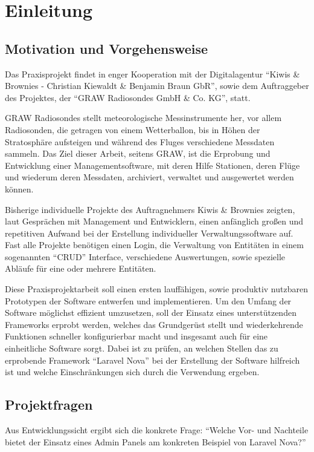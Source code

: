 \section{Einleitung}

\subsection{Motivation und Vorgehensweise}
Das Praxisprojekt findet in enger Kooperation mit der Digitalagentur \enquote{Kiwis \& Brownies - Christian Kiewaldt \& Benjamin Braun GbR}\cite{kiwis}, sowie dem Auftraggeber des Projektes, der \enquote{GRAW Radiosondes GmbH \& Co. KG}\cite{graw}, statt.

GRAW Radiosondes stellt meteorologische Messinstrumente her, vor allem Radiosonden, die getragen von einem Wetterballon, bis in Höhen der Stratosphäre aufsteigen und während des Fluges verschiedene Messdaten sammeln.
Das Ziel dieser Arbeit, seitens GRAW, ist die Erprobung und Entwicklung einer Managementsoftware, mit deren Hilfe Stationen, deren Flüge und wiederum deren Messdaten, archiviert, verwaltet und ausgewertet werden können.

Bisherige individuelle Projekte des Auftragnehmers Kiwis \& Brownies zeigten, laut Gesprächen mit Management und Entwicklern, einen anfänglich großen und repetitiven Aufwand bei der Erstellung individueller Verwaltungssoftware auf.
Fast alle Projekte benötigen einen Login, die Verwaltung von Entitäten in einem sogenannten \enquote{CRUD}\cite{crud} Interface, verschiedene Auswertungen, sowie spezielle Abläufe für eine oder mehrere Entitäten.

Diese Praxisprojektarbeit soll einen ersten lauffähigen, sowie produktiv nutzbaren Prototypen der Software entwerfen und implementieren.
Um den Umfang der Software möglichst effizient umzusetzen, soll der Einsatz eines unterstützenden Frameworks erprobt werden, welches das Grundgerüst stellt und wiederkehrende Funktionen schneller konfigurierbar macht und insgesamt auch für eine einheitliche Software sorgt.
Dabei ist zu prüfen, an welchen Stellen das zu erprobende Framework \enquote{Laravel Nova}\cite{laravel-nova} bei der Erstellung der Software hilfreich ist und welche Einschränkungen sich durch die Verwendung ergeben.
\newpage

\subsection{Projektfragen}
Aus Entwicklungssicht ergibt sich die konkrete Frage:
\enquote{Welche Vor- und Nachteile bietet der Einsatz eines Admin Panels am konkreten Beispiel von Laravel Nova?}

